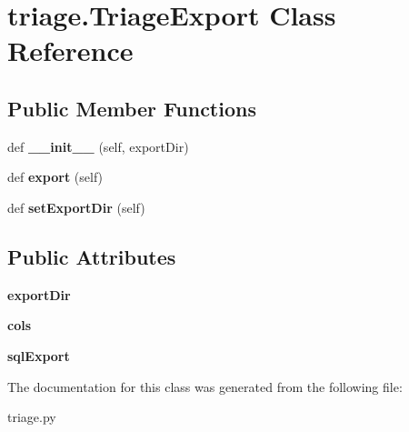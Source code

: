 \hypertarget{classtriage_1_1_triage_export}{}\section{triage.\+Triage\+Export Class Reference}
\label{classtriage_1_1_triage_export}
\subsection*{Public Member Functions}
\begin{DoxyCompactItemize}
\item 
\mbox{\label{classtriage_1_1_triage_export_a003f60b3b54110e507f1535431f6db28}} 
def {\bfseries \+\_\+\+\_\+init\+\_\+\+\_\+} (self, export\+Dir)
\item 
\mbox{\label{classtriage_1_1_triage_export_a3950a4d185e51c0c1f0520466e0c3cdc}} 
def {\bfseries export} (self)
\item 
\mbox{\label{classtriage_1_1_triage_export_a836c213290af8135fc68a7aa84b5aac2}} 
def {\bfseries set\+Export\+Dir} (self)
\end{DoxyCompactItemize}
\subsection*{Public Attributes}
\begin{DoxyCompactItemize}
\item 
\mbox{\label{classtriage_1_1_triage_export_aa6e618d3aecd77c85c0d2543dd00d129}} 
{\bfseries export\+Dir}
\item 
\mbox{\label{classtriage_1_1_triage_export_acb12bd1f86b62a25d4deca94994c1995}} 
{\bfseries cols}
\item 
\mbox{\label{classtriage_1_1_triage_export_ac76420dc930bd8cae2670fe8a2b9f54e}} 
{\bfseries sql\+Export}
\end{DoxyCompactItemize}


The documentation for this class was generated from the following file\+:\begin{DoxyCompactItemize}
\item 
triage.\+py\end{DoxyCompactItemize}
